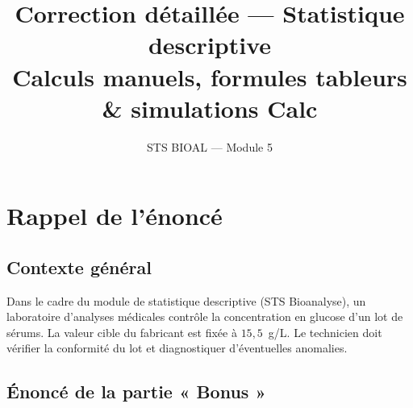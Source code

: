 \documentclass[11pt,a4paper]{article}
\title{\textbf{Correction détaillée — Statistique descriptive}\\[0.3em]
\large Calculs manuels, formules tableurs \& simulations Calc}
\author{STS BIOAL — Module 5}
\date{}
\begin{document}
\maketitle

\tableofcontents
\newpage

\section{Rappel de l'énoncé}

\subsection*{Contexte général}

Dans le cadre du module de statistique descriptive (STS Bioanalyse),
un laboratoire d'analyses médicales contrôle la concentration en
glucose d'un lot de sérums. La valeur cible du fabricant est fixée
à \( 15{,}5 \)~g/L. Le technicien doit vérifier la conformité du lot
et diagnostiquer d'éventuelles anomalies.

\subsection*{Énoncé de la partie « Bonus »}
\end{document}
